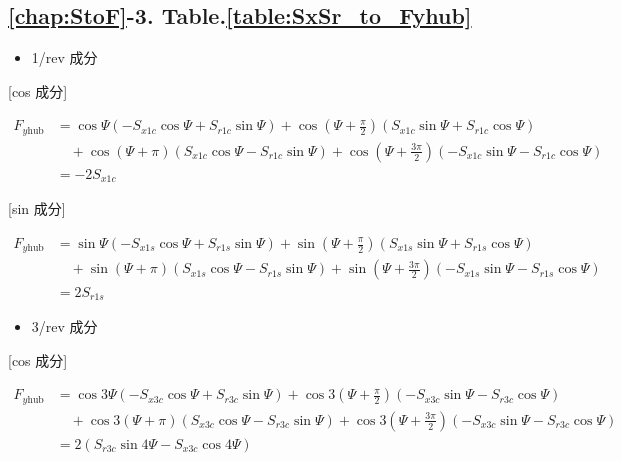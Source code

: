     \subsection*{\ref{chap:StoF}-3. Table.\ref{table:SxSr_to_Fyhub}}

    \begin{itemize}
    \item 1/rev 成分
    \end{itemize}

    [cos 成分]

    \begin{align}
    F_{y\mathrm{hub}}
    &= \cos\Psi
    \left(
    - S_{x1c}\cos\Psi + S_{r1c}\sin\Psi
    \right)
    + \cos\left(\Psi + \frac{\pi}{2}\right)
    \left(
    S_{x1c}\sin\Psi + S_{r1c}\cos\Psi
    \right) \nonumber \\
    &\quad
    + \cos(\Psi + \pi)
    \left(
    S_{x1c}\cos\Psi - S_{r1c}\sin\Psi
    \right)
    + \cos\left(\Psi + \frac{3\pi}{2}\right)
    \left(
    - S_{x1c}\sin\Psi - S_{r1c}\cos\Psi
    \right) \nonumber \\
    &= -2 S_{x1c}
    \end{align}

    [sin 成分]

    \begin{align}
    F_{y\mathrm{hub}}
    &= \sin\Psi
    \left(
    - S_{x1s}\cos\Psi + S_{r1s}\sin\Psi
    \right)
    + \sin\left(\Psi + \frac{\pi}{2}\right)
    \left(
    S_{x1s}\sin\Psi + S_{r1s}\cos\Psi
    \right) \nonumber \\
    &\quad
    + \sin(\Psi + \pi)
    \left(
    S_{x1s}\cos\Psi - S_{r1s}\sin\Psi
    \right)
    + \sin\left(\Psi + \frac{3\pi}{2}\right)
    \left(
    - S_{x1s}\sin\Psi - S_{r1s}\cos\Psi
    \right) \nonumber \\
    &= 2 S_{r1s}
    \end{align}

    \begin{itemize}
    \item 3/rev 成分
    \end{itemize}

    [cos 成分] 

    \begin{align}
    F_{y\mathrm{hub}}
    &= \cos 3\Psi
    \left(
    - S_{x3c}\cos\Psi + S_{r3c}\sin\Psi
    \right)
    + \cos 3\left(\Psi + \frac{\pi}{2}\right)
    \left(
    - S_{x3c}\sin\Psi - S_{r3c}\cos\Psi
    \right) \nonumber \\
    &\quad
    + \cos 3(\Psi + \pi)
    \left(
    S_{x3c}\cos\Psi - S_{r3c}\sin\Psi
    \right)
    + \cos 3\left(\Psi + \frac{3\pi}{2}\right)
    \left(
    - S_{x3c}\sin\Psi - S_{r3c}\cos\Psi
    \right) \nonumber \\
    &= 2\left(
    S_{r3c}\sin 4\Psi - S_{x3c}\cos 4\Psi
    \right)
    \end{align}

